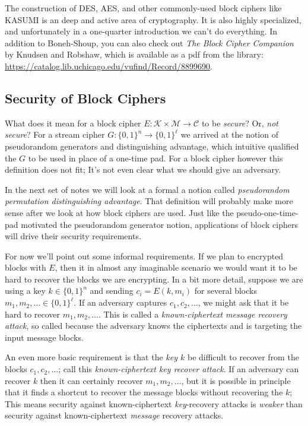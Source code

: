 \documentclass[11pt]{article}
\newcommand{\msgs}{\mathcal{M}}
\newcommand{\ctxts}{\mathcal{C}}
\newcommand{\keys}{\mathcal{K}}
\newcommand{\bits}{\{0,1\}}
\begin{document}
The construction of DES, AES, and other commonly-used block ciphers like KASUMI
is an deep and active area of cryptography. It is also highly specialized, and
unfortunately in a one-quarter introduction we can't do everything.  In
addition to Boneh-Shoup, you can also check out \emph{The Block Cipher
Companion} by Knudsen and Robshaw, which is available as a pdf from the
library: \url{https://catalog.lib.uchicago.edu/vufind/Record/8899690}.

\subsection{Security of Block Ciphers}

What does it mean for a block cipher $E:\keys\times\msgs\to\ctxts$ to be
\emph{secure}? Or, \emph{not secure}? For a stream cipher
$G:\bits^n\to\bits^\ell$ we arrived at the notion of pseudorandom generators and
distinguishing advantage, which intuitive qualified the $G$ to be used in place
of a one-time pad. For a block cipher however this definition does not fit;
It's not even clear what we should give an adversary.

In the next set of notes we will look at a formal a notion called
\emph{pseudorandom permutation distinguishing advantage}.  That definition will
probably make more sense after we look at how block ciphers are used. Just like
the pseudo-one-time-pad motivated the pseudorandom generator notion,
applications of block ciphers will drive their security requirements.

For now we'll point out some informal requirements. If we plan to encrypted
blocks with $E$, then it in almost any imaginable scenario we would want it to
be hard to recover the blocks we are encrypting.  In a bit more detail, suppose
we are using a key $k\in\bits^n$ and sending $c_i = E(k,m_i)$ for several
blocks $m_1,m_2,\ldots\in\bits^\ell$. If an adversary captures
$c_1,c_2,\ldots$, we might ask that it be hard to recover $m_1,m_2,\ldots$.
This is called a \emph{known-ciphertext message recovery attack}, so called
because the adversary knows the ciphertexts and is targeting the input message
blocks.

An even more basic requirement is that the \emph{key $k$} be difficult to
recover from the blocks $c_1,c_2,\ldots$; call this \emph{known-ciphertext key
recover attack}. If an adversary can recover $k$ then it can certainly recover
$m_1,m_2,\ldots$, but it is possible in principle that it finds a shortcut to
recover the message blocks without recovering the $k$; This means security
against known-ciphertext \emph{key}-recovery attacks is \emph{weaker} than
security against known-ciphertext \emph{message} recovery attacks. 
\end{document}
